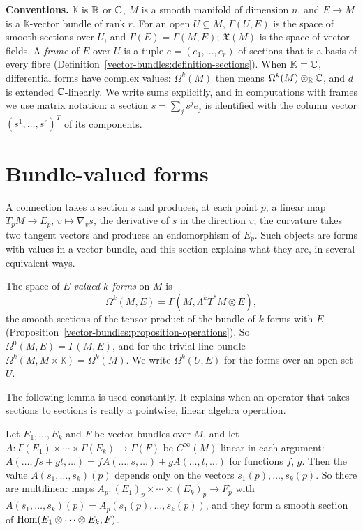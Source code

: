\noindent\textbf{Conventions.} $\mathbb{K}$ is $\mathbb{R}$ or $\mathbb{C}$, $M$ is a smooth manifold of dimension $n$, and $E \to M$ is a $\mathbb{K}$-vector bundle of rank $r$. For an open
$U \subseteq M$, $\Gamma(U, E)$ is the space of smooth sections over $U$, and $\Gamma(E) = \Gamma(M, E)$; $\mathfrak{X}(M)$ is the space of vector fields. A \emph{frame} of $E$
over $U$ is a tuple $e = (e_1, \ldots, e_r)$ of sections that is a basis of every fibre (Definition~\ref{vector-bundles:definition-sections}). When $\mathbb{K} = \mathbb{C}$,
differential forms have complex values: $\Omega^k(M)$ then means $\Omega^k(M) \otimes_{\mathbb{R}} \mathbb{C}$, and $d$ is extended $\mathbb{C}$-linearly. We write sums explicitly, and in
computations with frames we use matrix notation: a section $s = \sum_js^je_j$ is identified with the column vector $(s^1, \ldots, s^r)^T$ of its components.

\section{Bundle-valued forms}\label{connections:section-bundle-valued-forms}

A connection takes a section $s$ and produces, at each point $p$, a linear map $T_pM \to E_p$, $v \mapsto \nabla_vs$, the derivative of $s$ in the direction $v$; the curvature
takes two tangent vectors and produces an endomorphism of $E_p$. Such objects are forms with values in a vector bundle, and this section explains what they are, in several
equivalent ways.

\begin{definition}\label{connections:definition-bundle-valued-forms}
The space of \emph{$E$-valued $k$-forms} on $M$ is
\[
\Omega^k(M, E) = \Gamma(M, \Lambda^kT^*M \otimes E),
\]
the smooth sections of the tensor product of the bundle of $k$-forms with $E$ (Proposition~\ref{vector-bundles:proposition-operations}). So $\Omega^0(M, E) = \Gamma(M, E)$,
and for the trivial line bundle $\Omega^k(M, M \times \mathbb{K}) = \Omega^k(M)$. We write $\Omega^k(U, E)$ for the forms over an open set $U$.
\end{definition}

The following lemma is used constantly. It explains when an operator that takes sections to sections is really a pointwise, linear algebra operation.

\begin{lemma}[Tensoriality]\label{connections:lemma-tensoriality}
Let $E_1, \ldots, E_k$ and $F$ be vector bundles over $M$, and let $A \colon \Gamma(E_1) \times \cdots \times \Gamma(E_k) \to \Gamma(F)$ be $C^\infty(M)$-linear in each
argument: $A(\ldots, fs + gt, \ldots) = fA(\ldots, s, \ldots) + gA(\ldots, t, \ldots)$ for functions $f$, $g$. Then the value $A(s_1, \ldots, s_k)(p)$ depends only on the
vectors $s_1(p), \ldots, s_k(p)$. So there are multilinear maps $A_p \colon (E_1)_p \times \cdots \times (E_k)_p \to F_p$ with $A(s_1, \ldots, s_k)(p) = A_p(s_1(p), \ldots, s_k(p))$,
and they form a smooth section of $\operatorname{Hom}(E_1 \otimes \cdots \otimes E_k, F)$.
\end{lemma}

